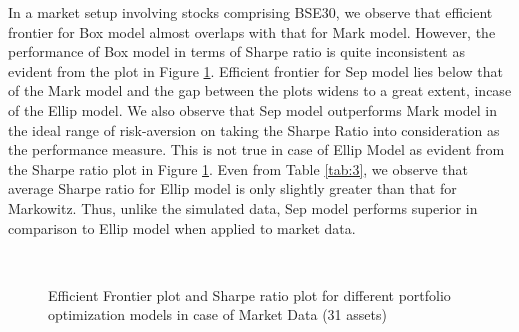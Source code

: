 In a  market setup involving stocks comprising BSE30, we observe that efficient frontier for Box model almost overlaps with that for Mark model. However, the performance of Box model in terms of Sharpe ratio is quite inconsistent as evident from the plot in Figure \ref{fig:3}. Efficient frontier for Sep model lies below that of the Mark model and the gap between the plots widens to a great extent, incase of the Ellip model. We also observe that Sep model outperforms Mark model in the ideal range of risk-aversion on taking the Sharpe Ratio into consideration as the performance measure. This is not true in case of Ellip Model as evident from the Sharpe ratio plot in Figure \ref{fig:3}. Even from Table \ref{tab:3}, we observe that average Sharpe ratio for Ellip model is only slightly greater than that for Markowitz. Thus, unlike the simulated data, Sep model performs superior in comparison to Ellip model when applied to market data.
\begin{figure}[!h]
    
    
     \hfill
   \\
   \caption{Efficient Frontier plot and Sharpe ratio plot for different portfolio optimization models in case of Market Data (31 assets)}
   \label{fig:3}
\end{figure}

